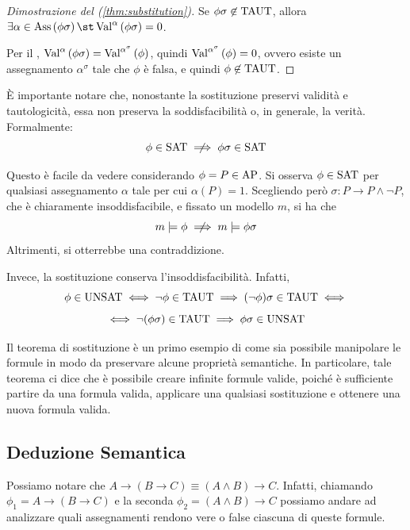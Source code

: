 \begin{proof}[Dimostrazione del (\ref{thm:substitution})]
  Se \(\phi\sigma \not\in \Taut\), allora \(\exists \alpha \in \Ass{\phi\sigma} \st \Val{\alpha}[\phi\sigma] = 0\).

  Per il , \(\Val{\alpha}[\phi\sigma] = \Val{\alpha^\sigma}[\phi]\), quindi \(\Val{\alpha^\sigma}[\phi] = 0\), ovvero esiste un assegnamento \(\alpha^\sigma\) tale che \(\phi\) è falsa, e quindi \(\phi \not\in \Taut\).
\end{proof}


\begin{observation}{}
  È importante notare che, nonostante la sostituzione preservi validità e tautologicità, essa non preserva la soddisfacibilità o, in generale, la verità.
  Formalmente:
  \[\phi \in \Sat \centernot\implies \phi\sigma \in \Sat\]

  Questo è facile da vedere considerando \(\phi = P \in \AP\). Si osserva \(\phi \in \Sat\) per qualsiasi assegnamento \(\alpha\) tale per cui \(\alpha(P)=1\).
  Scegliendo però \(\sigma : P \to P\land \neg P\), che è chiaramente insoddisfacibile, e fissato un modello \(m\), si ha che
  \[m\models\phi \centernot\implies m\models\phi\sigma\]
  Altrimenti, si otterrebbe una contraddizione.

  Invece, la sostituzione conserva l'insoddisfacibilità. Infatti,
  \[\phi \in \Unsat \iff \neg \phi \in \Taut \implies (\neg\phi)\sigma \in \Taut\iff \]
  \[\iff \neg(\phi\sigma) \in \Taut \implies \phi\sigma \in \Unsat\]
\end{observation}

Il teorema di sostituzione è un primo esempio di come sia possibile manipolare le formule in modo da preservare alcune proprietà semantiche. 
In particolare, tale teorema ci dice che è possibile creare infinite formule valide, poiché è sufficiente partire da una formula valida, applicare una qualsiasi sostituzione e ottenere una nuova formula valida.

\subsection{Deduzione Semantica}

Possiamo notare che \(A \to (B\to C)\equiv (A\land B)\to C\).
Infatti, chiamando \(\phi_1 = A \to (B\to C)\) e la seconda \(\phi_2 = (A\land B)\to C\) possiamo andare ad analizzare quali assegnamenti rendono vere o false ciascuna di queste formule.

